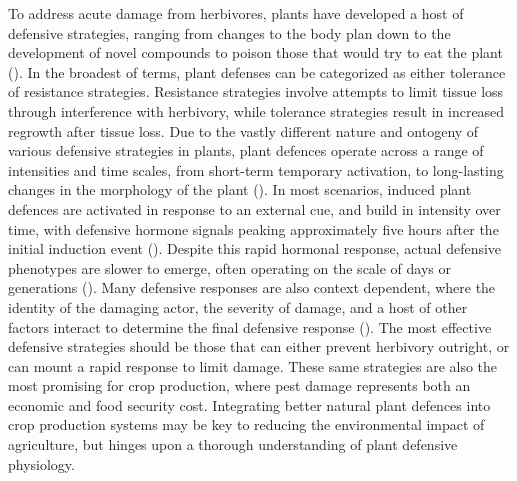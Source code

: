 \documentclass[12pt, letterpaper, ]{article}
\begin{document}
To address acute damage from herbivores, plants have developed a host of defensive strategies, ranging from changes to the body plan down to the development of novel compounds to poison those that would try to eat the plant (\cite{agrawal_plant_2006}). In the broadest of terms, plant defenses can be categorized as either tolerance of resistance strategies. Resistance strategies involve attempts to limit tissue loss through interference with herbivory, while tolerance strategies result in increased regrowth after tissue loss. Due to the vastly different nature and ontogeny of various defensive strategies in plants, plant defences operate across a range of intensities and time scales, from short-term temporary activation, to long-lasting changes in the morphology of the plant (\cite{agrawal_plant_2006, karban_induced_1989}). In most scenarios, induced plant defences are activated in response to an external cue, and build in intensity over time, with defensive hormone signals peaking approximately five hours after the initial induction event (\cite{schmelz_quantitative_2003}). Despite this rapid hormonal response, actual defensive phenotypes are slower to emerge, often operating on the scale of days or generations (\cite{karban_induced_1989}). Many defensive responses are also context dependent, where the identity of the damaging actor, the severity of damage, and a host of other factors interact to determine the final defensive response (\cite{waterman_simulated_2019}). The most effective defensive strategies should be those that can either prevent herbivory outright, or can mount a rapid response to limit damage. These same strategies are also the most promising for crop production, where pest damage represents both an economic and food security cost. Integrating better natural plant defences into crop production systems may be key to reducing the environmental impact of agriculture, but hinges upon a thorough understanding of plant defensive physiology.
\end{document}
